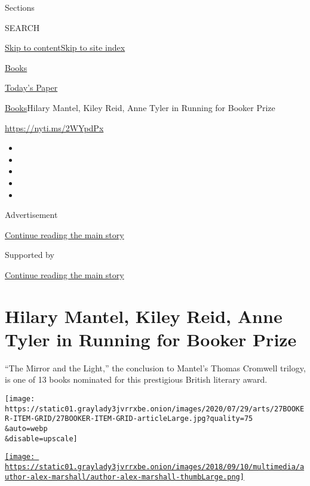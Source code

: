 Sections

SEARCH

\protect\hyperlink{site-content}{Skip to
content}\protect\hyperlink{site-index}{Skip to site index}

\href{https://www.nytimes3xbfgragh.onion/section/books}{Books}

\href{https://myaccount.nytimes3xbfgragh.onion/auth/login?response_type=cookie\&client_id=vi}{}

\href{https://www.nytimes3xbfgragh.onion/section/todayspaper}{Today's
Paper}

\href{/section/books}{Books}\textbar{}Hilary Mantel, Kiley Reid, Anne
Tyler in Running for Booker Prize

\url{https://nyti.ms/2WYpdPx}

\begin{itemize}
\item
\item
\item
\item
\item
\end{itemize}

Advertisement

\protect\hyperlink{after-top}{Continue reading the main story}

Supported by

\protect\hyperlink{after-sponsor}{Continue reading the main story}

\hypertarget{hilary-mantel-kiley-reid-anne-tyler-in-running-for-booker-prize}{%
\section{Hilary Mantel, Kiley Reid, Anne Tyler in Running for Booker
Prize}\label{hilary-mantel-kiley-reid-anne-tyler-in-running-for-booker-prize}}

``The Mirror and the Light,'' the conclusion to Mantel's Thomas Cromwell
trilogy, is one of 13 books nominated for this prestigious British
literary award.

\texttt{[image: https://static01.graylady3jvrrxbe.onion/images/2020/07/29/arts/27BOOKER-ITEM-GRID/27BOOKER-ITEM-GRID-articleLarge.jpg?quality=75\\\&auto=webp\\\&disable=upscale]}

\href{https://www.nytimes3xbfgragh.onion/by/alex-marshall}{\texttt{[image: https://static01.graylady3jvrrxbe.onion/images/2018/09/10/multimedia/author-alex-marshall/author-alex-marshall-thumbLarge.png]}}

